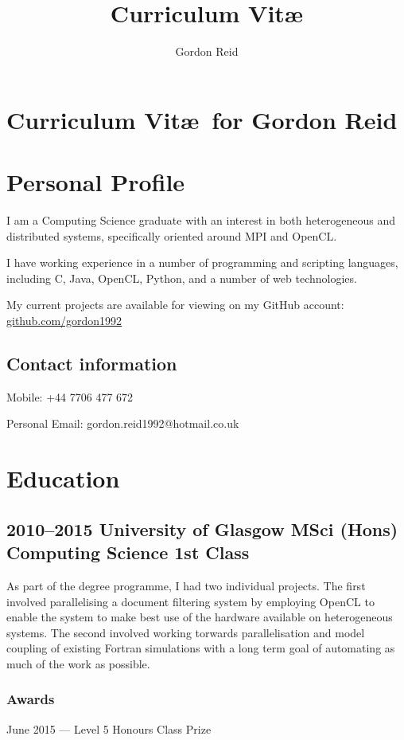 \documentclass[11pt,a4paper]{article}
\title{Curriculum Vit\ae}
\author{Gordon Reid}
\begin{document}
\section*{Curriculum Vit\ae\ for Gordon Reid}


\section*{Personal Profile}

I am a Computing Science graduate with an interest in both heterogeneous and
distributed systems, specifically oriented around MPI and OpenCL\@.

I have working experience in a number of programming and scripting languages,
including C, Java, OpenCL, Python, and a number of web technologies.

My current projects are available for viewing on my GitHub
account: \url{github.com/gordon1992}

\subsection*{Contact information}
Mobile: +44 7706 477 672

Personal Email: gordon.reid1992@hotmail.co.uk

\section*{Education}

\subsection*{2010--2015 University of Glasgow MSci (Hons) Computing Science 1st Class}

As part of the degree programme, I had two individual projects. The first
involved parallelising a document filtering system by employing OpenCL to enable
the system to make best use of the hardware available on heterogeneous systems.
The second involved working torwards parallelisation and model coupling of
existing Fortran simulations with a long term goal of automating as much of the
work as possible.

\subsubsection*{Awards}

June 2015 --- Level 5 Honours Class Prize
\end{document}
